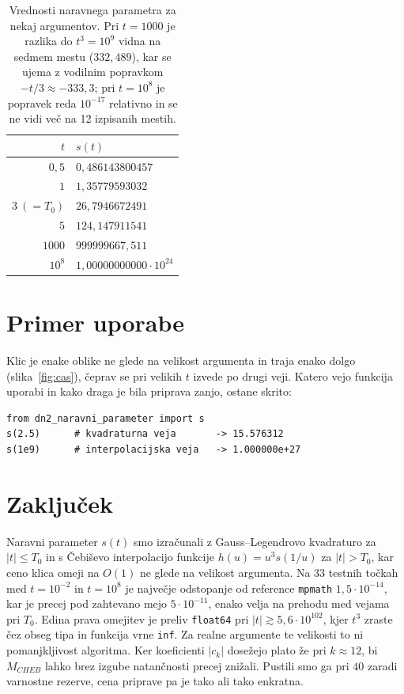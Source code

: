 \documentclass[11pt,a4paper]{article}
\begin{document}
\begin{table}[htb]\centering
\begin{tabular}{rl}
\toprule
$t$ & $s(t)$ \\ \midrule
$0{,}5$      & $0{,}486143800457$ \\
$1$          & $1{,}35779593032$ \\
$3\ (=T_0)$  & $26{,}7946672491$ \\
$5$          & $124{,}147911541$ \\
$1000$       & $999999667{,}511$ \\
$10^{8}$     & $1{,}00000000000\cdot 10^{24}$ \\
\bottomrule
\end{tabular}
\caption{Vrednosti naravnega parametra za nekaj argumentov. Pri $t=1000$ je
razlika do $t^3 = 10^9$ vidna na sedmem mestu ($332{,}489$), kar se ujema z
vodilnim popravkom $-t/3 \approx -333{,}3$; pri $t=10^8$ je popravek reda
$10^{-17}$ relativno in se ne vidi več na 12 izpisanih mestih.}
\label{tab:vrednosti}
\end{table}

\section{Primer uporabe}

Klic je enake oblike ne glede na velikost argumenta in traja enako dolgo
(slika~\ref{fig:cas}), 
čeprav se pri velikih $t$ izvede po drugi veji.
Katero vejo funkcija uporabi in kako draga je bila priprava zanjo, ostane skrito:

\begin{lstlisting}
from dn2_naravni_parameter import s
s(2.5)      # kvadraturna veja       -> 15.576312
s(1e9)      # interpolacijska veja   -> 1.000000e+27
\end{lstlisting}

\section{Zaključek}

Naravni parameter $s(t)$ smo izračunali z Gauss--Legendrovo kvadraturo za
$|t| \le T_0$ in s Čebiševo interpolacijo funkcije $h(u) = u^3 s(1/u)$ za
$|t| > T_0$, kar ceno klica omeji na $O(1)$ ne glede na velikost argumenta.
Na 33 testnih točkah med $t=10^{-2}$ in $t=10^{8}$ je največje odstopanje od
reference \texttt{mpmath} $1{,}5\cdot 10^{-14}$, kar je precej pod zahtevano
mejo $5\cdot 10^{-11}$, enako velja na prehodu med vejama pri $T_0$. Edina
prava omejitev je preliv \texttt{float64} pri $|t| \gtrsim 5{,}6\cdot
10^{102}$, kjer $t^3$ zraste čez obseg tipa in funkcija vrne \texttt{inf}.
Za realne argumente te velikosti to ni pomanjkljivost algoritma. Ker
koeficienti $|c_k|$ dosežejo plato že pri $k \approx 12$, bi $M_{CHEB}$ lahko
brez izgube natančnosti precej znižali. Pustili smo ga pri $40$ zaradi
varnostne rezerve, cena priprave pa je tako ali tako enkratna.
\end{document}
